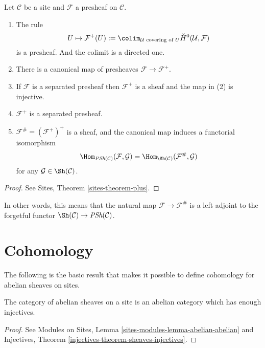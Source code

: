\begin{theorem}
\label{theorem-sheafification}
Let $\mathcal{C}$ be a site and $\mathcal{F}$ a presheaf on $\mathcal{C}$.
\begin{enumerate}
\item The rule
$$
U \mapsto \mathcal{F}^+(U) :=
\colim_{\mathcal{U} \text{ covering of }U}
\check H^0(\mathcal{U}, \mathcal{F})
$$
is a presheaf. And the colimit is a directed one.
\item There is a canonical map of presheaves $\mathcal{F} \to \mathcal{F}^+$.
\item If $\mathcal{F}$ is a separated presheaf then $\mathcal{F}^+$ is a sheaf
and the map in (2) is injective.
\item $\mathcal{F}^+$ is a separated presheaf.
\item $\mathcal{F}^\# = (\mathcal{F}^+)^+$ is a sheaf, and the canonical
map induces a functorial isomorphism
$$
\Hom_{\textit{PSh}(\mathcal{C})}(\mathcal{F}, \mathcal{G}) =
\Hom_{\Sh(\mathcal{C})}(\mathcal{F}^\#, \mathcal{G})
$$
for any $\mathcal{G} \in \Sh(\mathcal{C})$.
\end{enumerate}
\end{theorem}

\begin{proof}
See Sites, Theorem \ref{sites-theorem-plus}.
\end{proof}

\noindent
In other words, this means that the natural map
$\mathcal{F} \to \mathcal{F}^\#$ is a left adjoint to the forgetful functor
$\Sh(\mathcal{C}) \to \textit{PSh}(\mathcal{C})$.




\section{Cohomology}
\label{section-cohomology}

\noindent
The following is the basic result that makes it possible to define cohomology
for abelian sheaves on sites.

\begin{theorem}
\label{theorem-enough-injectives}
The category of abelian sheaves on a site is an abelian category
which has enough injectives.
\end{theorem}

\begin{proof}
See
Modules on Sites, Lemma \ref{sites-modules-lemma-abelian-abelian} and
Injectives, Theorem \ref{injectives-theorem-sheaves-injectives}.
\end{proof}

